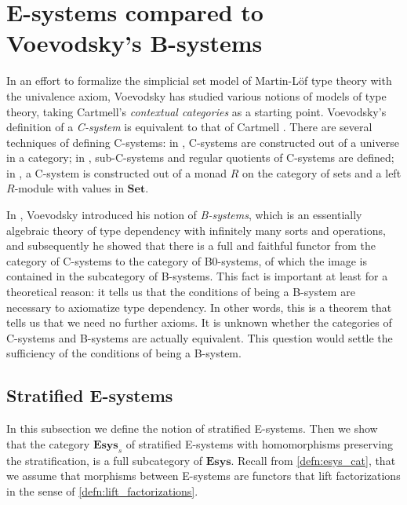 \section{E-systems compared to Voevodsky's B-systems}\label{sec:esys_compared}
In an effort to formalize the simplicial set model of Martin-L\"of type theory
with the univalence axiom, Voevodsky has studied various notions of models of
type theory, taking Cartmell's \emph{contextual categories} as a starting
point. Voevodsky's definition of a \emph{C-system} is equivalent to that of Cartmell
\cite{VV_C-systems_quotients}. There are several techniques of defining 
C-systems: in \cite{VV_Csys_univ}, C-systems are constructed out of a universe
in a category; in \cite{VV_C-systems_quotients}, sub-C-systems and regular
quotients of C-systems are defined; in \cite{VV_C-systems_monad}, a C-system
is constructed out of a monad $R$ on the category of sets and a left $R$-module
with values in $\mathbf{Set}$. 

In \cite{VV_B-systems}, Voevodsky introduced his notion of \emph{B-systems}, which is
an essentially algebraic theory of type dependency with infinitely many sorts 
and operations, and subsequently he showed that there is a full and faithful
functor from the category of C-systems to the category of B0-systems, of which
the image is contained in the subcategory of B-systems. This fact is important at least
for a theoretical reason: it tells us that the conditions of being a B-system
are necessary to axiomatize type dependency. In other words,
this is a theorem that tells us that we need no further axioms. It is
unknown whether the categories of C-systems and B-systems are actually equivalent.
This question would settle the sufficiency of the conditions of being a B-system.

\subsection{Stratified E-systems}

In this subsection we define the notion of stratified E-systems. Then we show that the category $\mathbf{Esys}_s$ of stratified E-systems with homomorphisms preserving the stratification, is a full subcategory of $\mathbf{Esys}$. Recall from \autoref{defn:esys_cat}, that we assume that morphisms between E-systems are functors that lift factorizations in the sense of \autoref{defn:lift_factorizations}.

